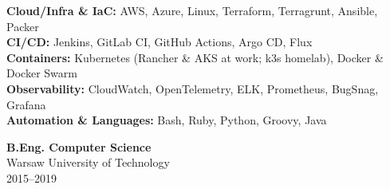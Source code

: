 \documentclass[11pt, a4paper]{awesome-cv}
\begin{document}
\makecvheader

\noindent
\begin{minipage}[t]{0.63\textwidth}
  \vspace{0pt}
  \par
  \vspace{2mm}
  \begin{cvparagraph}
    \textbf{Cloud/Infra \& IaC:} AWS, Azure, Linux, Terraform, Terragrunt, Ansible, Packer\\
    \textbf{CI/CD:} Jenkins, GitLab CI, GitHub Actions, Argo CD, Flux\\
    \textbf{Containers:} Kubernetes (Rancher \& AKS at work; k3s homelab), Docker \& Docker Swarm\\
    \textbf{Observability:} CloudWatch, OpenTelemetry, ELK, Prometheus, BugSnag, Grafana\\
    \textbf{Automation \& Languages:} Bash, Ruby, Python, Groovy, Java
  \end{cvparagraph}
\end{minipage}\hfill
\begin{minipage}[t]{0.32\textwidth}
  \vspace{0pt}
  \par
  \vspace{2mm}
  \begin{cvparagraph}
    \textbf{B.Eng. Computer Science}\\
    Warsaw University of Technology\\
    2015--2019
  \end{cvparagraph}
\end{minipage}

\vspace{-4mm}

% 
%
%
% 
%


\end{document}
